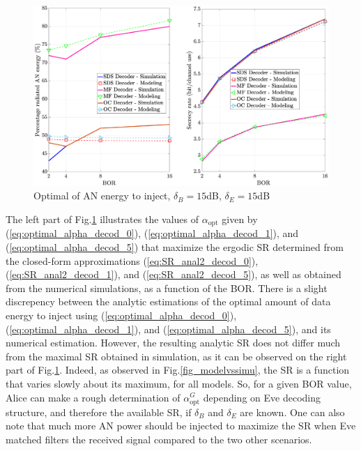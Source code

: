 \documentclass[journal,comsoc]{IEEEtran}
\let\MYoriglatexcaption\caption
\renewcommand{\caption}[2][\relax]{\MYoriglatexcaption[#2]{#2}}
\begin{document}
\begin{figure}[h!t]
	\centering
	\includegraphics[width=1\linewidth]{graphs/optimal_alpha_15dB.eps}
	\caption{Optimal of AN energy to inject, $\delta_B = 15$dB,  $\delta_E = 15$dB}
	\label{fig_optimalAN}
\end{figure}
The left part of Fig.\ref{fig_optimalAN} illustrates the values of $\alpha_{\text{opt}}$ given by (\ref{eq:optimal_alpha_decod_0}), (\ref{eq:optimal_alpha_decod_1}), and (\ref{eq:optimal_alpha_decod_5}) that maximize the  ergodic SR determined from the closed-form approximations (\ref{eq:SR_anal2_decod_0}), (\ref{eq:SR_anal2_decod_1}), and (\ref{eq:SR_anal2_decod_5}), as well as obtained from the numerical simulations, as a function of the BOR. There is a slight discrepency between the analytic estimations of the optimal amount of data energy to inject using (\ref{eq:optimal_alpha_decod_0}), (\ref{eq:optimal_alpha_decod_1}), and (\ref{eq:optimal_alpha_decod_5}), and its numerical estimation. However, the resulting analytic SR does not differ much from the maximal SR obtained in simulation, as it can be observed on the right part of Fig.\ref{fig_optimalAN}. Indeed, as observed in Fig.\ref{fig_modelvssimu}, the SR is a function that varies slowly about its maximum, for all models. So, for a given BOR value, Alice can make a rough determination of $\alpha_{\text{opt}}^G$ depending on Eve decoding structure, and therefore the available SR, if $\delta_B$ and $\delta_E$ are known. One can also note that much more AN power should be injected to maximize the SR when Eve matched filters the received signal compared to the two other scenarios.
\end{document}
